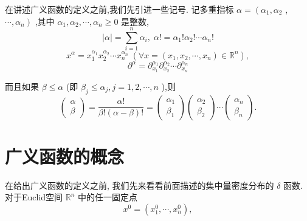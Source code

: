 \documentclass[lang=cn,newtx,10pt,scheme=chinese,thmcnt=chapter]{elegantbook}
\begin{document}
在讲述广义函数的定义之前,我们先引进一些记号. 记多重指标 \(\alpha  = \left( {{\alpha }_{1},{\alpha }_{2}}\right.\) , \(\left. {\cdots ,{\alpha }_{n}}\right)\) ,其中 \({\alpha }_{1},{\alpha }_{2},\cdots ,{\alpha }_{n} \geq  0\) 是整数,
\begin{equation*}
\left| \alpha \right|  = \mathop{\sum }\limits_{{i = 1}}^{n}{\alpha }_{i},\;\alpha ! = {\alpha }_{1}!{\alpha }_{2}!\cdots {\alpha }_{n}!
\end{equation*}
\begin{equation*}
{x}^{\alpha } = {x}_{1}^{{\alpha }_{1}}{x}_{2}^{{\alpha }_{2}}\cdots {x}_{n}^{{\alpha }_{n}}\;\left( {\forall x = \left( {{x}_{1},{x}_{2},\cdots ,{x}_{n}}\right)  \in  {\mathbb{R}}^{n}}\right) ,
\end{equation*}
\begin{equation*}
{\partial }^{\alpha } = {\partial }_{{x}_{1}}^{{\alpha }_{1}}{\partial }_{{x}_{2}}^{{\alpha }_{2}}\cdots {\partial }_{{x}_{n}}^{{\alpha }_{n}}
\end{equation*}

而且如果 \(\beta  \leqslant  \alpha\) (即 \({\beta }_{j} \leqslant  {\alpha }_{j},j = 1,2,\cdots ,n\) ),则
\begin{equation*}
\left( \begin{array}{l} \alpha \\  \beta  \end{array}\right)  = \frac{\alpha !}{\beta !\left( {\alpha  - \beta }\right) !} = \left( \begin{array}{l} {\alpha }_{1} \\  {\beta }_{1} \end{array}\right) \left( \begin{array}{l} {\alpha }_{2} \\  {\beta }_{2} \end{array}\right) \cdots \left( \begin{array}{l} {\alpha }_{n} \\  {\beta }_{n} \end{array}\right) .
\end{equation*}

\section{广义函数的概念}
在给出广义函数的定义之前, 我们先来看看前面描述的集中量密度分布的 \(\delta\) 函数. 对于Euclid空间 \({\mathbb{R}}^{n}\) 中的任一固定点
\begin{equation*}
{x}^{0} = \left( {{x}_{1}^{0},\cdots ,{x}_{n}^{0}}\right) ,
\end{equation*}
\end{document}
